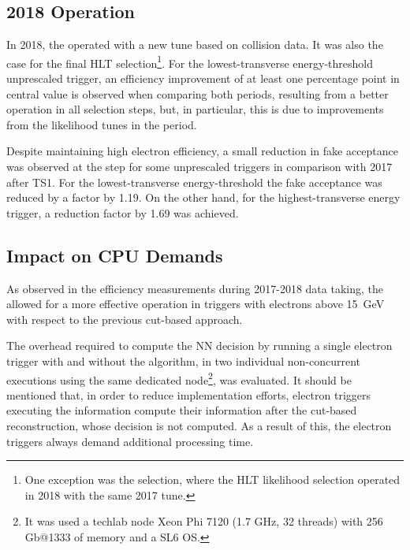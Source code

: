\subsection{2018 Operation}\label{ssec:2018_ringer_operation}

In 2018, the \rnn{} operated with a new tune based on collision data. It was also the case for the final HLT
selection\footnote{One exception was the \medium{} selection, where the HLT likelihood selection operated in 2018 with the same 2017 tune.}. For the lowest-transverse energy-threshold unprescaled trigger, an efficiency improvement of at least one percentage point in central value is observed when comparing both periods, resulting from a better operation in all selection steps, but, in particular, this is due to improvements from the likelihood tunes in the period.

Despite maintaining high electron efficiency, a small reduction in fake acceptance was observed at the  \fastcalo{} step for some unprescaled triggers in comparison with 2017 after TS1. For the lowest-transverse energy-threshold the fake acceptance was reduced by a factor by 1.19. On the other hand, for the highest-transverse energy trigger, a reduction factor by 1.69 was achieved.




\subsection{Impact on CPU Demands} \label{ssec:cpu_reduction}

As observed in the efficiency measurements during 2017-2018 data taking, the \rnn{} allowed for a more effective \fastcalo{} operation in triggers with electrons above \SI{15}{\GeV}  with respect to the previous cut-based approach. 



The overhead required to compute the NN decision by running a single electron trigger with and without the \rnn algorithm, in two individual non-concurrent executions using the same dedicated node\footnote{It was used a techlab node Xeon Phi 7120 (1.7 GHz, 32 threads) with 256 Gb@1333 of memory and a SL6 OS.}, was evaluated. It should be mentioned that, in order to reduce implementation efforts, electron triggers executing the \rnn{} information compute their information after the cut-based reconstruction, whose decision is not computed. As a result of this, the \rnn{} electron triggers always demand additional \fastcalo processing time.

